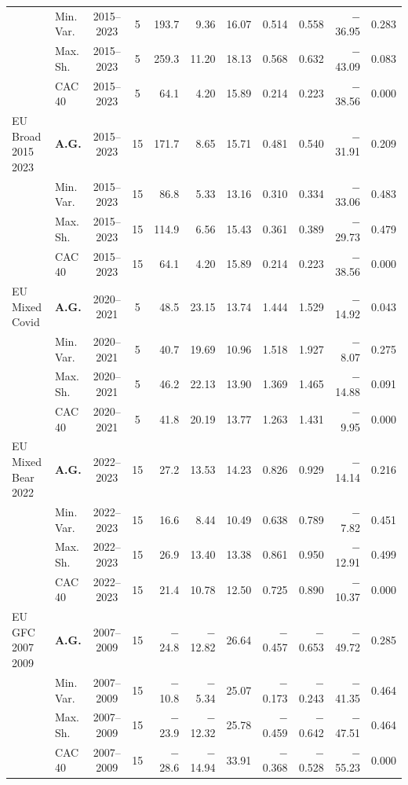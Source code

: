 \begin{longtable}{p{2.6cm} l c c r r r r r r r}
 & Min.\,Var. & 2015--2023 & 5 & 193.7 & 9.36 & 16.07 & 0.514 & 0.558 & $-$36.95 & 0.283 \\
 & Max.\,Sh. & 2015--2023 & 5 & 259.3 & 11.20 & 18.13 & 0.568 & 0.632 & $-$43.09 & 0.083 \\
 & CAC 40 & 2015--2023 & 5 & 64.1 & 4.20 & 15.89 & 0.214 & 0.223 & $-$38.56 & 0.000 \\
\midrule
EU Broad 2015 2023 & \textbf{A.G.} & 2015--2023 & 15 & 171.7 & 8.65 & 15.71 & 0.481 & 0.540 & $-$31.91 & 0.209 \\
 & Min.\,Var. & 2015--2023 & 15 & 86.8 & 5.33 & 13.16 & 0.310 & 0.334 & $-$33.06 & 0.483 \\
 & Max.\,Sh. & 2015--2023 & 15 & 114.9 & 6.56 & 15.43 & 0.361 & 0.389 & $-$29.73 & 0.479 \\
 & CAC 40 & 2015--2023 & 15 & 64.1 & 4.20 & 15.89 & 0.214 & 0.223 & $-$38.56 & 0.000 \\
\midrule
EU Mixed Covid & \textbf{A.G.} & 2020--2021 & 5 & 48.5 & 23.15 & 13.74 & 1.444 & 1.529 & $-$14.92 & 0.043 \\
 & Min.\,Var. & 2020--2021 & 5 & 40.7 & 19.69 & 10.96 & 1.518 & 1.927 & $-$8.07 & 0.275 \\
 & Max.\,Sh. & 2020--2021 & 5 & 46.2 & 22.13 & 13.90 & 1.369 & 1.465 & $-$14.88 & 0.091 \\
 & CAC 40 & 2020--2021 & 5 & 41.8 & 20.19 & 13.77 & 1.263 & 1.431 & $-$9.95 & 0.000 \\
\midrule
EU Mixed Bear 2022 & \textbf{A.G.} & 2022--2023 & 15 & 27.2 & 13.53 & 14.23 & 0.826 & 0.929 & $-$14.14 & 0.216 \\
 & Min.\,Var. & 2022--2023 & 15 & 16.6 & 8.44 & 10.49 & 0.638 & 0.789 & $-$7.82 & 0.451 \\
 & Max.\,Sh. & 2022--2023 & 15 & 26.9 & 13.40 & 13.38 & 0.861 & 0.950 & $-$12.91 & 0.499 \\
 & CAC 40 & 2022--2023 & 15 & 21.4 & 10.78 & 12.50 & 0.725 & 0.890 & $-$10.37 & 0.000 \\
\midrule
EU GFC 2007 2009 & \textbf{A.G.} & 2007--2009 & 15 & $-$24.8 & $-$12.82 & 26.64 & $-$0.457 & $-$0.653 & $-$49.72 & 0.285 \\
 & Min.\,Var. & 2007--2009 & 15 & $-$10.8 & $-$5.34 & 25.07 & $-$0.173 & $-$0.243 & $-$41.35 & 0.464 \\
 & Max.\,Sh. & 2007--2009 & 15 & $-$23.9 & $-$12.32 & 25.78 & $-$0.459 & $-$0.642 & $-$47.51 & 0.464 \\
 & CAC 40 & 2007--2009 & 15 & $-$28.6 & $-$14.94 & 33.91 & $-$0.368 & $-$0.528 & $-$55.23 & 0.000 \\

\end{longtable}
